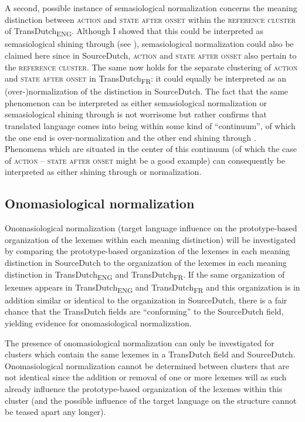 A second, possible instance of semasiological normalization concerns the meaning distinction between \textsc{action} and \textsc{state after onset} within the \textsc{reference cluster} of TransDutch\textsubscript{ENG}. Although I showed that this could be interpreted as semasiological shining through (see ), semasiological normalization could also be claimed here since in SourceDutch, \textsc{action} and \textsc{state after onset} also pertain to the \textsc{reference cluster}. The same now holds for the separate clustering of \textsc{action} and \textsc{state after onset} in TransDutch\textsubscript{FR}: it could equally be interpreted as an (over-)normalization of the distinction in SourceDutch. The fact that the same phenomenon can be interpreted as either semasiological normalization or semasiological shining through is not worrisome but rather confirms that translated language comes into being within some kind of ``continuum'', of which the one end is over-normalization and the other end shining through \citep[272]{hansen-schirra_towards_2012}. Phenomena which are situated in the center of this continuum (of which the case of \textsc{action} – \textsc{state after onset} might be a good example) can consequently be interpreted as either shining through or normalization.

\subsection{Onomasiological normalization}\label{sec:4.7.2}  
Onomasiological normalization (target language influence on the prototype-based organization of the lexemes within each meaning distinction) will be investigated by comparing the prototype-based organization of the lexemes in each meaning distinction in SourceDutch to the organization of the lexemes in each meaning distinction in TransDutch\textsubscript{ENG} and TransDutch\textsubscript{FR}. If the same organization of lexemes appears in TransDutch\textsubscript{ENG} and TransDutch\textsubscript{FR} and this organization is in addition similar or identical to the organization in SourceDutch, there is a fair chance that the TransDutch fields are ``conforming'' to the SourceDutch field, yielding evidence for onomasiological normalization.

The presence of onomasiological normalization can only be investigated for clusters which contain the same lexemes in a TransDutch field and SourceDutch. Onomasiological normalization cannot be determined between clusters that are not identical since the addition or removal of one or more lexemes will as such already influence the prototype-based organization of the lexemes within this cluster (and the possible influence of the target language on the structure cannot be teased apart any longer).

